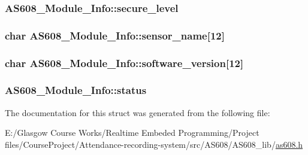 \subsubsection[{secure\+\_\+level}]{ A\+S608\+\_\+\+Module\+\_\+\+Info\+::secure\+\_\+level}\label{struct_a_s608___module___info_aba1374610650e703373b402d4c863dd6}
\hypertarget{struct_a_s608___module___info_af759a7036827579b15391f8661c86278}{}
\subsubsection[{sensor\+\_\+name}]{\setlength{\rightskip}{0pt plus 5cm}char A\+S608\+\_\+\+Module\+\_\+\+Info\+::sensor\+\_\+name\mbox{[}12\mbox{]}}\label{struct_a_s608___module___info_af759a7036827579b15391f8661c86278}
\hypertarget{struct_a_s608___module___info_a04a2be6b3d910c93ad23b6685ff36ea9}{}
\subsubsection[{software\+\_\+version}]{\setlength{\rightskip}{0pt plus 5cm}char A\+S608\+\_\+\+Module\+\_\+\+Info\+::software\+\_\+version\mbox{[}12\mbox{]}}\label{struct_a_s608___module___info_a04a2be6b3d910c93ad23b6685ff36ea9}
\hypertarget{struct_a_s608___module___info_a3496aaef2379cc60f7e2ef45eb196830}{}
\subsubsection[{status}]{ A\+S608\+\_\+\+Module\+\_\+\+Info\+::status}\label{struct_a_s608___module___info_a3496aaef2379cc60f7e2ef45eb196830}


The documentation for this struct was generated from the following file\+:\begin{DoxyCompactItemize}
\item 
E\+:/\+Glasgow Course Works/\+Realtime Embeded Programming/\+Project files/\+Course\+Project/\+Attendance-\/recording-\/system/src/\+A\+S608/\+A\+S608\+\_\+lib/\hyperlink{as608_8h}{as608.\+h}\end{DoxyCompactItemize}
